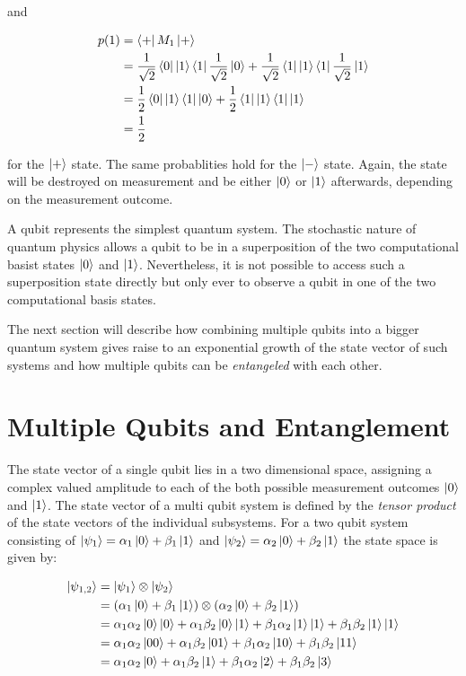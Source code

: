 and

\begin{align}
  p(1) &= \Bra{+} M_1 \Ket{+} \\
       &= \frac{1}{\sqrt{2}} \Bra{0} \Ket{1} \Bra{1} \frac{1}{\sqrt{2}} \Ket{0} + \frac{1}{\sqrt{2}} \Bra{1} \Ket{1} \Bra{1} \frac{1}{\sqrt{2}} \Ket{1} \\
       &= \frac{1}{2} \Bra{0} \Ket{1} \Bra{1} \Ket{0} + \frac{1}{2} \Bra{1} \Ket{1} \Bra{1} \Ket{1} \\
       &= \frac{1}{2}
\end{align}



for the $\Ket{+}$ state. The same probablities hold for the
$\Ket{-}$ state.
Again, the state will be destroyed on measurement and be either $\Ket{0}$ or $\Ket{1}$ afterwards, depending on the measurement outcome.

A qubit represents the simplest quantum system. The stochastic nature of quantum physics allows a qubit to be in a superposition of the
two computational basist states $\Ket{0}$ and $\Ket{1}$. 
Nevertheless, it is not possible to access such a superposition state directly
but only ever to observe a qubit in one of the two computational basis states.

The next section will describe how combining multiple qubits into a bigger
quantum system gives raise to an exponential growth of the state vector of such systems and how multiple qubits can be \textit{entangeled}
with each other.

\section{Multiple Qubits and Entanglement}

The state vector of a single qubit lies in a two dimensional 
space, assigning a complex valued amplitude to each of the both possible measurement outcomes
$\Ket{0}$ and $\Ket{1}$. The state vector of a multi qubit system is defined by
the \textit{tensor product} of the state vectors of the individual subsystems.
For a two qubit system consisting of $\Ket{\psi_1} = \alpha_1 \Ket{0} + \beta_1
\Ket{1}$ and $\Ket{\psi_2} = \alpha_2 \Ket{0} + \beta_2 \Ket{1}$ the state space
is given by:

\begin{align}
  \Ket{\psi_{1,2}} &= \Ket{\psi_1} \otimes \Ket{\psi_2} \\
                   &= (\alpha_1 \Ket{0} + \beta_1 \Ket{1}) \otimes (\alpha_2 \Ket{0} + \beta_2 \Ket{1}) \\
                   &= \alpha_1 \alpha_2 \Ket{0}\Ket{0} + \alpha_1 \beta_2 \Ket{0} \Ket{1} + \beta_1 \alpha_2 \Ket{1} \Ket{1} + \beta_1 \beta_2 \Ket{1} \Ket{1} \\
                   &= \alpha_1 \alpha_2 \Ket{00} + \alpha_1 \beta_2 \Ket{01} + \beta_1 \alpha_2 \Ket{10} + \beta_1 \beta_2 \Ket{11} \\
                   &= \alpha_1 \alpha_2 \Ket{0} + \alpha_1 \beta_2 \Ket{1} + \beta_1 \alpha_2 \Ket{2} + \beta_1 \beta_2 \Ket{3}
\end{align}

